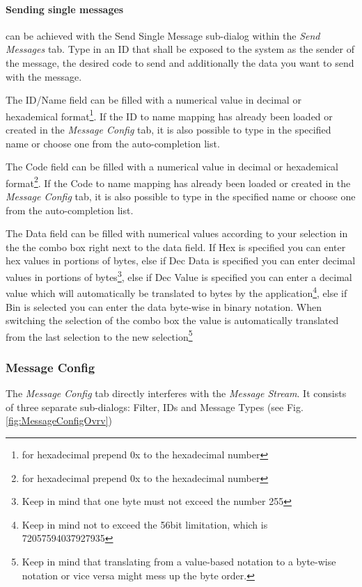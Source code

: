 \documentclass[12pt,a4paper]{scrartcl}
\begin{document}
\paragraph{Sending single messages} can be achieved with the Send Single Message sub-dialog within the \textit{Send Messages} tab. Type in an ID that shall be exposed to the system as the sender of the message, the desired code to send and additionally the data you want to send with the message. 

The ID/Name field can be filled with a numerical value in decimal or hexademical format\footnote{for hexadecimal prepend 0x to the hexadecimal number}. If the ID to name mapping has already been loaded or created in the \textit{Message Config} tab, it is also possible to type in the specified name or choose one from the auto-completion list.

The Code field can be filled with a numerical value in decimal or hexademical format\footnote{for hexadecimal prepend 0x to the hexadecimal number}. If the Code to name mapping has already been loaded or created in the \textit{Message Config} tab, it is also possible to type in the specified name or choose one from the auto-completion list. 

The Data field can be filled with numerical values according to your selection in the the combo box right next to the data field. If Hex is specified you can enter hex values in portions of bytes, else if Dec Data is specified you can enter decimal values in portions of bytes\footnote{Keep in mind that one byte must not exceed the number 255}, else if Dec Value is specified you can enter a decimal value which will automatically be translated to bytes by the application\footnote{Keep in mind not to exceed the 56bit limitation, which is 72057594037927935}, else if Bin is selected you can enter the data byte-wise in binary notation. When switching the selection of the combo box the value is automatically translated from the last selection to the new selection\footnote{Keep in mind that translating from a value-based notation to a byte-wise notation or vice versa might mess up the byte order.}

\subsubsection{Message Config}
\label{subsubsec:GettingStartedOverviewMsgConfig}
The \textit{Message Config} tab directly interferes with the \textit{Message Stream}. It consists of three separate sub-dialogs: Filter, IDs and Message Types (see Fig. \ref{fig:MessageConfigOvrv})
\end{document}
